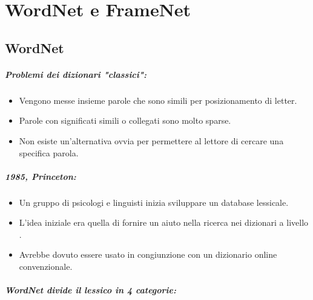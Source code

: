 \chapter{WordNet e FrameNet}

\section{WordNet}


\paragraph{Problemi dei dizionari "classici":}

\begin{itemize}
  \item Vengono messe insieme parole che sono simili per posizionamento di letter. 
  \item Parole con significati simili o collegati sono molto sparse. 
  \item Non esiste un'alternativa ovvia per permettere al lettore di cercare una specifica parola.
\end{itemize}


\paragraph{1985, Princeton:}

\begin{itemize}
  \item Un gruppo di psicologi e linguisti inizia sviluppare un database lessicale.  
  \item L'idea iniziale era quella di fornire un aiuto nella ricerca nei dizionari a livello . 
  \item Avrebbe dovuto essere usato in congiunzione con un dizionario online convenzionale.
\end{itemize}

\paragraph{WordNet divide il lessico in 4 categorie:}

